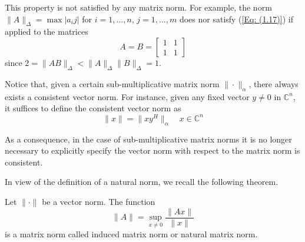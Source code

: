 This property is not satisfied by any matrix norm. For example, the norm $ \|A\|_\Delta = \max{|a_ij|}$ for $i = 1, ..., n$, $j = 1, ..., m$ does nor satisfy (\ref{Eq: (1.17)}) if applied to the matrices
\[ A = B = \begin{bmatrix}
    1 & 1 \\
    1 & 1
\end{bmatrix} \]
since $2 = \|AB\|_\Delta < \|A\|_\Delta \|B\|_\Delta = 1$.

Notice that, given a certain sub-multiplicative matrix norm $\|\cdot\|_\alpha$, there always exists a consistent vector norm. For instance, given any fixed vector $y \neq 0$ in $\mathbb{C}^n$, it suffices to define the consistent vector norm as
\[ \|x\| = \| x y^H \|_\alpha \quad x \in \mathbb{C}^n\]

As a consequence, in the case of sub-multiplicative matrix norms it is no longer necessary to explicitly specify the vector norm with respect to the matrix norm is consistent.

In view of the definition of a natural norm, we recall the following theorem.

\begin{theorem}
    Let $\| \cdot \|$ be a vector norm. The function
    \begin{equation}
        \| A \| = \sup_{x \neq 0}{\frac{\| Ax \|}{\|x\|}}
        \label{Eq: (1.19)}
    \end{equation}
    is a matrix norm called induced matrix norm or natural matrix norm.
    \label{Theorem: 1.1}
\end{theorem}

